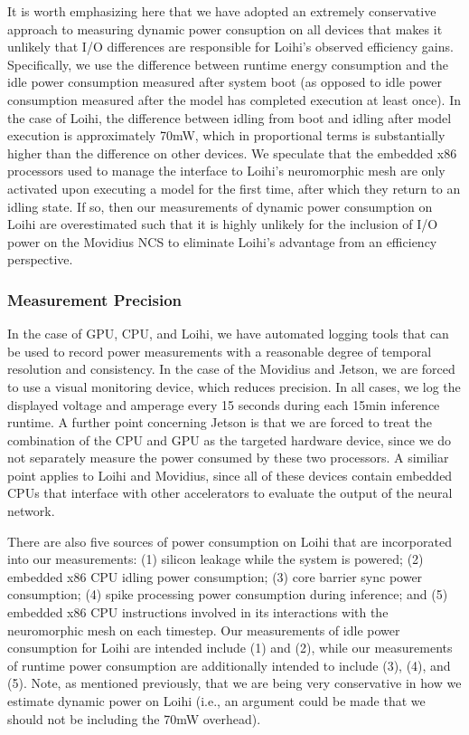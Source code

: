 \documentclass{article}
\begin{document}
It is worth emphasizing here that we have adopted an extremely conservative approach to measuring dynamic power consuption on all devices that makes it unlikely that I/O differences are responsible for Loihi's observed efficiency gains. Specifically, we use the difference between runtime energy consumption and the idle power consumption measured after system boot (as opposed to idle power consumption measured after the model has completed execution at least once). In the case of Loihi, the difference between idling from boot and idling after model execution is approximately 70mW, which in proportional terms is substantially higher than the difference on other devices. We speculate that the embedded x86 processors used to manage the interface to Loihi's neuromorphic mesh are only activated upon executing a model for the first time, after which they return to an idling state. If so, then our measurements of dynamic power consumption on Loihi are overestimated such that it is highly unlikely for the inclusion of I/O power on the Movidius NCS to eliminate Loihi's advantage from an efficiency perspective. 

\subsubsection{Measurement Precision}

In the case of GPU, CPU, and Loihi, we have automated logging tools that can be used to record power measurements with a reasonable degree of temporal resolution and consistency. In the case of the Movidius and Jetson, we are forced to use a visual monitoring device, which reduces precision. In all cases, we log the displayed voltage and amperage every 15 seconds during each 15min inference runtime. A further point concerning Jetson is that we are forced to treat the combination of the CPU and GPU as the targeted hardware device, since we do not separately measure the power consumed by these two processors. A similiar point applies to Loihi and Movidius, since all of these devices contain embedded CPUs that interface with other accelerators to evaluate the output of the neural network.

There are also five sources of power consumption on Loihi that are incorporated into our measurements: (1) silicon leakage while the system is powered; (2) embedded x86 CPU idling power consumption; (3) core barrier sync power consumption; (4) spike processing power consumption during inference; and (5) embedded x86 CPU instructions involved in its interactions with the neuromorphic mesh on each timestep. Our measurements of idle power consumption for Loihi are intended include (1) and (2), while our measurements of runtime power consumption are additionally intended to include (3), (4), and (5). Note, as mentioned previously, that we are being very conservative in how we estimate dynamic power on Loihi (i.e., an argument could be made that we should not be including the 70mW overhead).
\end{document}
